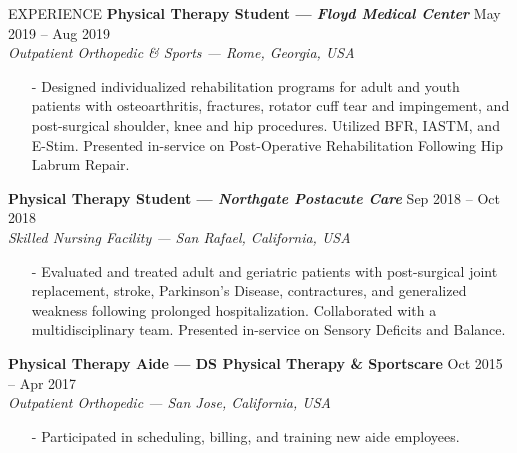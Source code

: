 \documentclass{resume} %
\begin{document}
\begin{rSection}{EXPERIENCE}
\textbf{Physical Therapy Student --- \textit{Floyd Medical Center}} \hfill May 2019 -- Aug 2019 \\
\textit{Outpatient Orthopedic \& Sports --- Rome, Georgia, USA}
\vspace*{-0.2cm}\begin{itemize}
    \item[-] Designed individualized rehabilitation programs for adult and youth patients with osteoarthritis, fractures, rotator cuff tear and impingement, and post-surgical shoulder, knee and hip procedures. Utilized BFR, IASTM, and E-Stim. Presented in-service on Post-Operative Rehabilitation Following Hip Labrum Repair.
\end{itemize}

\textbf{Physical Therapy Student --- \textit{Northgate Postacute Care}} \hfill Sep 2018 -- Oct 2018\\
\textit{Skilled Nursing Facility --- San Rafael, California, USA}
\vspace*{-0.2cm}\begin{itemize}
    \item[-] Evaluated and treated adult and geriatric patients with post-surgical joint replacement, stroke, Parkinson's Disease, contractures, and generalized weakness following prolonged hospitalization. Collaborated with a multidisciplinary team. Presented in-service on Sensory Deficits and Balance.
\end{itemize}

\textbf{Physical Therapy Aide --- DS Physical Therapy \& Sportscare} \hfill Oct 2015 -- Apr 2017\\
\textit{Outpatient Orthopedic --- San Jose, California, USA}
\vspace*{-0.2cm}\begin{itemize}
    \item[-] Participated in scheduling, billing, and training new aide employees.
\end{itemize}
\end{rSection}

\end{document}
